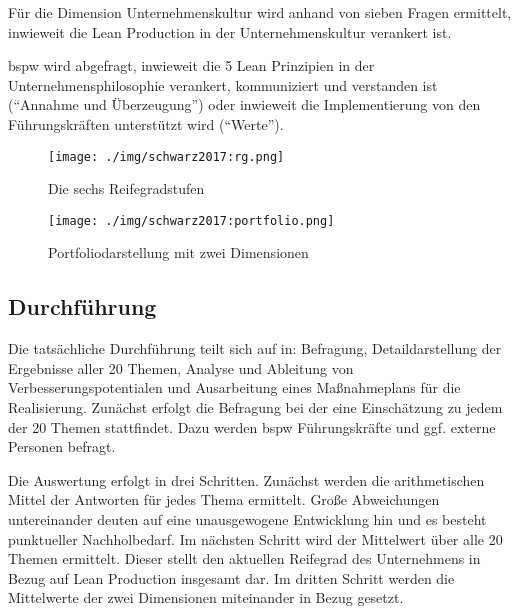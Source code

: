 Für die Dimension Unternehmenskultur wird anhand von sieben Fragen ermittelt, inwieweit die Lean Production in der Unternehmenskultur verankert ist. 

\Gls{bspw} wird abgefragt, inwieweit die 5 Lean Prinzipien in der Unternehmensphilosophie verankert, kommuniziert und verstanden ist (``Annahme und Überzeugung'') oder inwieweit die Implementierung von den Führungskräften unterstützt wird (``Werte''). 

\begin{figure}[!ht] 
    \begin{minipage}{0.3\linewidth} 
    \begin{center}
      \texttt{[image: ./img/schwarz2017:rg.png]}
    \end{center}
      \caption{Die sechs Reifegradstufen \cite{Schwarz2017}}\label{fig:links} 
    \end{minipage} 
    \hfill 
    \begin{minipage}{0.6\linewidth} 
 \texttt{[image: ./img/schwarz2017:portfolio.png]}
    \caption{Portfoliodarstellung mit zwei Dimensionen \cite{Schwarz2017}}\label{fig:rechts} 
    \end{minipage} 
  \end{figure} 

\subsection{Durchführung}
Die tatsächliche Durchführung teilt sich auf in: Befragung, Detaildarstellung der Ergebnisse aller 20 Themen, Analyse und Ableitung von Verbesserungspotentialen und Ausarbeitung eines Maßnahmeplans für die Realisierung. 
%
Zunächst erfolgt die Befragung bei der eine Einschätzung zu jedem der 20 Themen stattfindet. Dazu werden \gls{bspw} Führungskräfte und ggf. externe Personen befragt. 

Die Auswertung erfolgt in drei Schritten. Zunächst werden die arithmetischen Mittel der Antworten für jedes Thema ermittelt. Große Abweichungen untereinander deuten auf eine unausgewogene Entwicklung hin und es besteht punktueller Nachholbedarf. Im nächsten Schritt wird der Mittelwert über alle 20 Themen ermittelt. Dieser stellt den aktuellen Reifegrad des Unternehmens in Bezug auf Lean Production insgesamt dar. Im dritten Schritt werden die Mittelwerte der zwei Dimensionen miteinander in Bezug gesetzt. %

